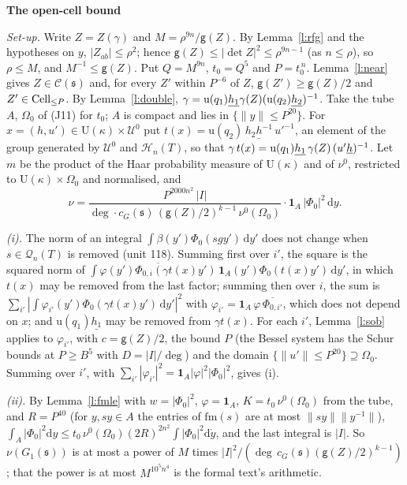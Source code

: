 \documentclass[11pt,a4paper]{article}
\makeatletter
\newcommand{\m}[1]{\mbox{$#1$}}        %
\newcommand{\sect}[2]{\refstepcounter{section}\label{#2}\par\addvspace{19pt plus 4pt minus 2pt}\Needspace{7\baselineskip}%
  \noindent\llap{{\fontsize{13.2}{16}\selectfont\bfseries\color{inkfaint}\thesection}\hspace{9pt}}%
  {\fontsize{13.2}{16}\selectfont\bfseries\color{ink}#1}\par\nopagebreak\vspace{-1pt}}
\theoremstyle{plainx}
\theoremstyle{uprightx}
\renewenvironment{proof}[1][Proof]{\par\pushQED{\qed}\normalfont\topsep0pt\partopsep0pt
  \trivlist\item[\hskip\labelsep\itshape #1.]\ignorespaces}{\popQED\endtrivlist\@endpefalse}
\newcommand{\dd}{\mathrm{d}}
\newcommand{\Hl}[2]{\mathcal{H}_{#1}(#2)}
\newcommand{\Ql}[2]{\mathcal{Q}_{#1}(#2)}
\newcommand{\Gone}[1]{G_1(#1)}
\newcommand{\cellc}[1]{c_G(#1)}
\newcommand{\Inp}[1]{\textup{(#1)}}
\newcommand{\emb}[1]{\underline{#1}}
\newcommand{\uq}[1]{\mathrm{u}(#1)}
\newcommand{\muz}{\nu^{0}}
\newcommand{\gd}[1]{\mathsf{g}(#1)}
\newcommand{\Ocell}[1]{\mathcal{C}(#1)}
\makeatother
\begin{document}
\sect{The open-cell bound}{s:oc}
\begin{proof}[Proof of Theorem C]
\emph{Set-up.} Write $Z=Z(\gamma)$ and $M=\rho^{9n}/\gd{Z}$. By Lemma~\ref{l:rfg} and the hypotheses on $y$,
$|Z_{ab}|\le\rho^{2}$; hence $\gd{Z}\le|\det Z|^{2}\le\rho^{9n-1}$ (as $n\le\rho$), so $\rho\le M$, and
$M^{-1}\le\gd{Z}$. Put $Q=M^{9n}$, $t_0=Q^{5}$ and $P=t_0^{\,n}$. Lemma~\ref{l:near} gives
$Z\in\Ocell{\mathfrak{s}}$ and, for every $Z'$ within $P^{-6}$ of $Z$, $\gd{Z'}\ge\gd{Z}/2$ and
\m{\IsBoundedInCell{Z'}{P}}. By Lemma~\ref{l:double}, $\gamma=\uq{q_1}\emb{h_1}\gramSection{Z}(\uq{q_2}\emb{h_2})^{-1}$.
Take the tube $A$, $\Omega_0$ of \Inp{J11} for $t_0$; $A$ is compact and lies in $\{\|y\|\le P^{20}\}$. For
$x=(h,u')\in\mathrm{U}(\kappa)\times\mathcal{U}^0$ put $t(x)=\uq{q_2}\,\emb{h_2h^{-1}}\,u'^{-1}$, an element of the
group generated by $\mathcal{U}^0$ and $\Hl{n}{T}$, so that
$\gamma\,t(x)=\uq{q_1}\emb{h_1}\,\gramSection{Z}\,(u'\emb{h})^{-1}$. Let $m$ be the product of the Haar probability
measure of $\mathrm{U}(\kappa)$ and of $\muz$, restricted to $\mathrm{U}(\kappa)\times\Omega_0$ and normalised, and
\[\nu=\frac{P^{2000n^{2}}\,|I|}{\deg\cdot\cellc{\mathfrak{s}}\,(\gd{Z}/2)^{k-1}\,\muz(\Omega_0)}\cdot\mathbf{1}_A\,|\Phi_0|^{2}\,\dd y.\]

\emph{(i).} The norm of an integral $\int\beta(y')\Phi_0(sgy')\,\dd y'$ does not change when $s\in\Ql{n}{T}$ is
removed (unit 118). Summing first over $i'$, the square is the squared norm of
$\int\overline{\varphi(y')\Phi_{0,i}(\gamma t(x)y')}\,\mathbf{1}_A(y')\Phi_0(t(x)y')\,\dd y'$, in which $t(x)$ may be
removed from the last factor; summing then over $i$, the sum is
$\sum_{i'}|\int\varphi_{i'}(y')\Phi_0(\gamma t(x)y')\,\dd y'|^{2}$ with
$\varphi_{i'}=\mathbf{1}_A\,\varphi\,\overline{\Phi_{0,i'}}$, which does not depend on $x$; and
$\uq{q_1}\emb{h_1}$ may be removed from $\gamma t(x)$. For each $i'$, Lemma~\ref{l:sob} applies to $\varphi_{i'}$,
with $c=\gd{Z}/2$, the bound $P$ (the Bessel system has the Schur bounds at $P\ge B^{5}$ with $D=|I|/\deg$) and the
domain $\{\|u'\|\le P^{20}\}\supseteq\Omega_0$. Summing over $i'$, with
$\sum_{i'}|\varphi_{i'}|^{2}=\mathbf{1}_A|\varphi|^{2}|\Phi_0|^{2}$, gives (i).

\emph{(ii).} By Lemma~\ref{l:fmle} with $w=|\Phi_0|^{2}$, $\varphi=\mathbf{1}_A$, $K=t_0\,\muz(\Omega_0)$ from the
tube, and $R=P^{40}$ (for $y,sy\in A$ the entries of $\mathrm{fm}(s)$ are at most $\|sy\|\|y^{-1}\|$),
$\int_A|\Phi_0|^{2}\dd y\le t_0\,\muz(\Omega_0)(2R)^{2n^{2}}\int|\Phi_0|^{2}\dd\dot y$, and the last integral is $|I|$.
So $\nu(\Gone{\mathfrak{s}})$ is at most a power of $M$ times $|I|^{2}/(\deg\,\cellc{\mathfrak{s}}(\gd{Z}/2)^{k-1})$;
that the power is at most $M^{10^{5}n^{4}}$ is the formal text's arithmetic.


\end{proof}
\end{document}
